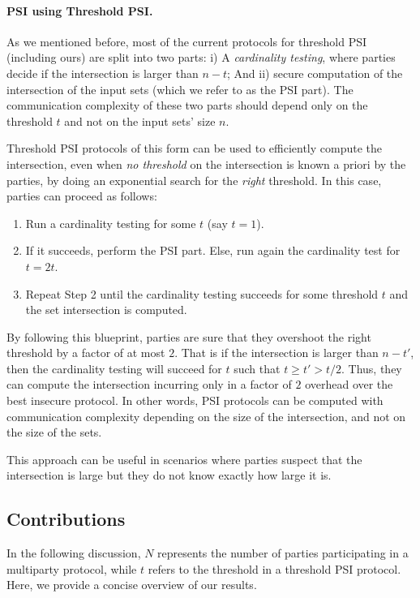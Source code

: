    
\paragraph{PSI using Threshold PSI.}
As we mentioned before,
most of the current protocols for threshold PSI (including ours) are split into two parts: i) A \emph{cardinality testing}, where parties decide if the intersection is larger than $n-t$; And ii) secure computation of the intersection of the input sets (which we refer to as the PSI part). The communication complexity of these two parts should depend only on the threshold $t$ and not on the input sets' size $n$.
    
Threshold PSI protocols of this form can be used to efficiently compute the intersection, even when \emph{no threshold} on the intersection is known a priori by the parties, by doing an exponential search for the \emph{right} threshold. In this case, parties can proceed as follows: 
\begin{enumerate}
\item Run a cardinality testing for some $t$ (say $t=1$).
\item If it succeeds, perform the PSI part. Else, run again the cardinality test for $t=2t$.
\item Repeat Step 2 until the cardinality testing succeeds for some threshold $t$ and the set intersection is computed.
\end{enumerate}{}
    
By following this blueprint, parties are sure that they overshoot the right threshold by a factor of at most $2$. That is if the intersection is larger than $n-t'$, then the cardinality testing will succeed for $t$ such that $t\geq t'> t/2$. Thus, they can compute the intersection incurring only in a factor of $2$ overhead over the best insecure protocol. In other words, PSI protocols can be computed with communication complexity depending on the size of the intersection, and not on the size of the sets.
    
This approach can be useful in scenarios where parties suspect that the intersection is large but they do not know exactly how large it is.
    


\subsection{Contributions}

In the following discussion, $N$ represents the number of parties participating in a multiparty protocol, while $t$ refers to the threshold in a threshold PSI protocol. Here, we provide a concise overview of our results.

